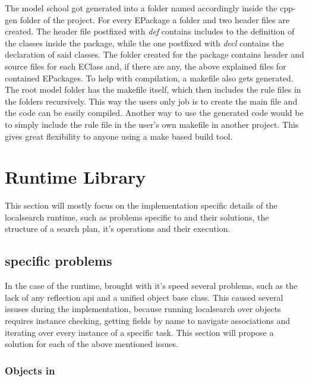The model school got generated into a folder named accordingly inside the
cpp-gen folder of the project. For every EPackage  a folder and two header files
are created. The header file postfixed with \emph{def} contains includes to
the definition of the classes inside the package, while the one postfixed with
\emph{decl} contains the declaration of said classes. The folder created for the
package contains header and source files for each EClass and, if there are any,
the above explained files for contained EPackages. To help with compilation, a
makefile also gets generated. The root model folder has the makefile itself,
which then includes the rule files in the folders recursively. This way the
users only job is to create the main file and the code can be easily compiled.
Another way to use the generated code would be to simply include the rule file
in the user's own makefile in another project. This gives great flexibility to
anyone using a make based build tool.

\section{Runtime Library}

This section will mostly focus on the implementation specific details of the
\CPP{} localsearch runtime, such as problems specific to \CPP{} and their
solutions, the structure of a search plan, it's operations and their execution.

\subsection{\CPP{} specific problems}\label{sect:CppSpecificProblems}

In the case of the runtime, \CPP{} brought with it's speed several problems, such
as the lack of any reflection api and a unified object base class. This caused
several issuses during the implementation, because running localsearch over \CPP{}
objects requires instance checking, getting fields by name to navigate
associations and iterating over every instance of a specific task. This section
will propose a solution for each of the above mentioned issues.

\subsubsection{Objects in \CPP{}}\label{sect:ObjectsInCpp}

